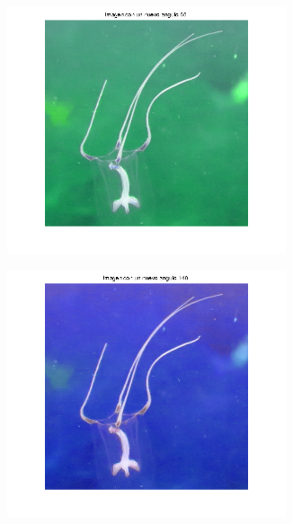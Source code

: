 \documentclass{article}
\begin{document}
\begin{figure}[H]
\begin{subfigure}{0.5\textwidth}
    \end{subfigure}\hfill
	\begin{subfigure}{0.5\textwidth}
	\centering
        \includegraphics[width=0.9\textwidth]{1901-h-60.png}
    \end{subfigure}\hfill
	\begin{subfigure}{0.5\textwidth}
	\centering
        \includegraphics[width=0.9\textwidth]{1901-h-140.png}
    \end{subfigure}\hfill
	\begin{subfigure}{0.5\textwidth}

\end{subfigure}
\end{figure}
\end{document}
